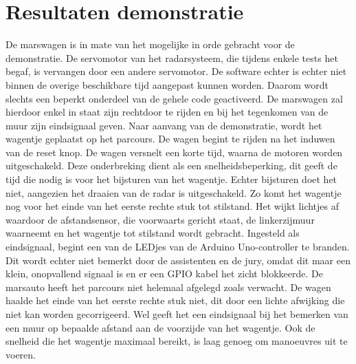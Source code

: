 
\section{Resultaten demonstratie}
De marswagen is in mate van het mogelijke in orde gebracht voor de demonstratie. 
De servomotor van het radarsysteem, die tijdens enkele tests het begaf, is 
vervangen door een andere servomotor. De software echter is echter niet binnen 
de overige beschikbare tijd aangepast kunnen worden. Daarom wordt slechts een 
beperkt onderdeel van de gehele code geactiveerd. De marswagen zal hierdoor 
enkel in staat zijn rechtdoor te rijden en bij het tegenkomen van de muur zijn 
eindsignaal geven.
Naar aanvang van de demonstratie, wordt het wagentje geplaatst op het parcours. 
De wagen begint te rijden na het induwen van de reset knop. De wagen versnelt 
een korte tijd, waarna de motoren worden uitgeschakeld. Deze onderbreking dient 
als een snelheidsbeperking, dit geeft de tijd die nodig is voor het bijsturen 
van het wagentje. Echter bijsturen doet het niet, aangezien het draaien van de 
radar is uitgeschakeld. Zo komt het wagentje nog voor het einde van het eerste 
rechte stuk tot stilstand. Het wijkt lichtjes af waardoor de afstandsensor, die 
voorwaarts gericht staat, de linkerzijmuur waarneemt en het wagentje tot 
stilstand wordt gebracht. Ingesteld als eindsignaal, begint een van de LEDjes 
van de Arduino Uno-controller te branden. Dit wordt echter niet bemerkt door de 
assistenten en de jury, omdat dit maar een klein, onopvallend signaal is en er 
een GPIO kabel het zicht blokkeerde.
De marsauto heeft het parcours niet helemaal afgelegd zoals verwacht. De wagen 
haalde het einde van het eerste rechte stuk niet, dit door een lichte afwijking 
die niet kan worden gecorrigeerd. Wel geeft het een eindsignaal bij het bemerken 
van een muur op bepaalde afstand aan de voorzijde van het wagentje. Ook de 
snelheid die het wagentje maximaal bereikt, is laag genoeg om manoeuvres uit te 
voeren.